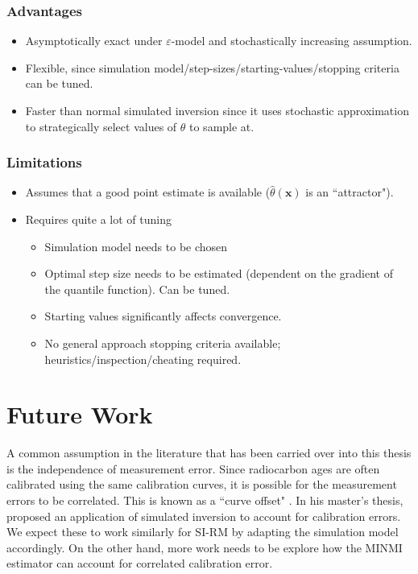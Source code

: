 \subsubsection{Advantages}

\begin{itemize}
    \item Asymptotically exact under $\varepsilon$-model and stochastically increasing assumption.
    \item Flexible, since simulation model/step-sizes/starting-values/stopping criteria can be tuned.
    \item Faster than normal simulated inversion since it uses stochastic approximation to strategically select values of $\theta$ to sample at.
\end{itemize}

\subsubsection{Limitations}

\begin{itemize}
    \item Assumes that a good point estimate is available ($\hat\theta(\bm{x})$ is an ``attractor").
    \item Requires quite a lot of tuning
        \begin{itemize}
            \item Simulation model needs to be chosen
            \item Optimal step size needs to be estimated (dependent on the gradient of the quantile function). Can be tuned.
            \item Starting values significantly affects convergence.
            \item No general approach stopping criteria available; heuristics/inspection/cheating required.
        \end{itemize}
\end{itemize}

\section{Future Work}

A common assumption in the literature that has been carried over into this thesis is the independence of measurement error. Since radiocarbon ages are often calibrated using the same calibration curves, it is possible for the measurement errors to be correlated. This is known as a ``curve offset" \cite{Ramsey2010}. In his master's thesis, \citet{King2020} proposed an application of simulated inversion to account for calibration errors. We expect these to work similarly for SI-RM by adapting the simulation model accordingly. On the other hand, more work needs to be explore how the MINMI estimator can account for correlated calibration error.

